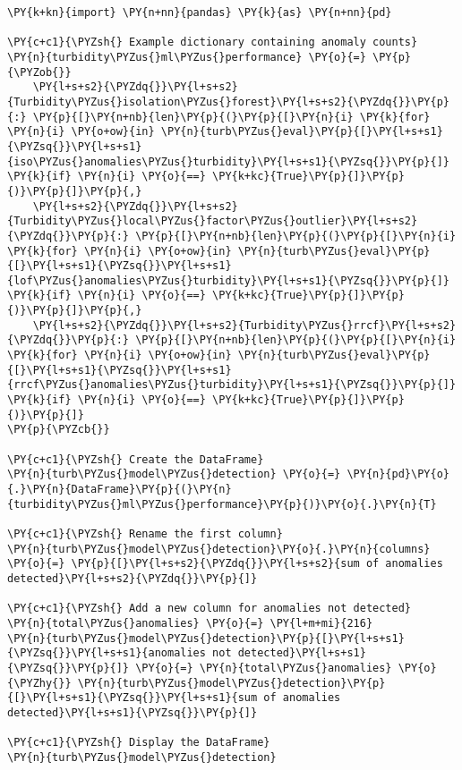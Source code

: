     \begin{tcolorbox}[breakable, size=fbox, boxrule=1pt, pad at break*=1mm,colback=cellbackground, colframe=cellborder]
\begin{Verbatim}[commandchars=\\\{\}]
\PY{k+kn}{import} \PY{n+nn}{pandas} \PY{k}{as} \PY{n+nn}{pd}

\PY{c+c1}{\PYZsh{} Example dictionary containing anomaly counts}
\PY{n}{turbidity\PYZus{}ml\PYZus{}performance} \PY{o}{=} \PY{p}{\PYZob{}}
    \PY{l+s+s2}{\PYZdq{}}\PY{l+s+s2}{Turbidity\PYZus{}isolation\PYZus{}forest}\PY{l+s+s2}{\PYZdq{}}\PY{p}{:} \PY{p}{[}\PY{n+nb}{len}\PY{p}{(}\PY{p}{[}\PY{n}{i} \PY{k}{for} \PY{n}{i} \PY{o+ow}{in} \PY{n}{turb\PYZus{}eval}\PY{p}{[}\PY{l+s+s1}{\PYZsq{}}\PY{l+s+s1}{iso\PYZus{}anomalies\PYZus{}turbidity}\PY{l+s+s1}{\PYZsq{}}\PY{p}{]} \PY{k}{if} \PY{n}{i} \PY{o}{==} \PY{k+kc}{True}\PY{p}{]}\PY{p}{)}\PY{p}{]}\PY{p}{,}
    \PY{l+s+s2}{\PYZdq{}}\PY{l+s+s2}{Turbidity\PYZus{}local\PYZus{}factor\PYZus{}outlier}\PY{l+s+s2}{\PYZdq{}}\PY{p}{:} \PY{p}{[}\PY{n+nb}{len}\PY{p}{(}\PY{p}{[}\PY{n}{i} \PY{k}{for} \PY{n}{i} \PY{o+ow}{in} \PY{n}{turb\PYZus{}eval}\PY{p}{[}\PY{l+s+s1}{\PYZsq{}}\PY{l+s+s1}{lof\PYZus{}anomalies\PYZus{}turbidity}\PY{l+s+s1}{\PYZsq{}}\PY{p}{]} \PY{k}{if} \PY{n}{i} \PY{o}{==} \PY{k+kc}{True}\PY{p}{]}\PY{p}{)}\PY{p}{]}\PY{p}{,}
    \PY{l+s+s2}{\PYZdq{}}\PY{l+s+s2}{Turbidity\PYZus{}rrcf}\PY{l+s+s2}{\PYZdq{}}\PY{p}{:} \PY{p}{[}\PY{n+nb}{len}\PY{p}{(}\PY{p}{[}\PY{n}{i} \PY{k}{for} \PY{n}{i} \PY{o+ow}{in} \PY{n}{turb\PYZus{}eval}\PY{p}{[}\PY{l+s+s1}{\PYZsq{}}\PY{l+s+s1}{rrcf\PYZus{}anomalies\PYZus{}turbidity}\PY{l+s+s1}{\PYZsq{}}\PY{p}{]} \PY{k}{if} \PY{n}{i} \PY{o}{==} \PY{k+kc}{True}\PY{p}{]}\PY{p}{)}\PY{p}{]}
\PY{p}{\PYZcb{}}

\PY{c+c1}{\PYZsh{} Create the DataFrame}
\PY{n}{turb\PYZus{}model\PYZus{}detection} \PY{o}{=} \PY{n}{pd}\PY{o}{.}\PY{n}{DataFrame}\PY{p}{(}\PY{n}{turbidity\PYZus{}ml\PYZus{}performance}\PY{p}{)}\PY{o}{.}\PY{n}{T}

\PY{c+c1}{\PYZsh{} Rename the first column}
\PY{n}{turb\PYZus{}model\PYZus{}detection}\PY{o}{.}\PY{n}{columns} \PY{o}{=} \PY{p}{[}\PY{l+s+s2}{\PYZdq{}}\PY{l+s+s2}{sum of anomalies detected}\PY{l+s+s2}{\PYZdq{}}\PY{p}{]}

\PY{c+c1}{\PYZsh{} Add a new column for anomalies not detected}
\PY{n}{total\PYZus{}anomalies} \PY{o}{=} \PY{l+m+mi}{216}
\PY{n}{turb\PYZus{}model\PYZus{}detection}\PY{p}{[}\PY{l+s+s1}{\PYZsq{}}\PY{l+s+s1}{anomalies not detected}\PY{l+s+s1}{\PYZsq{}}\PY{p}{]} \PY{o}{=} \PY{n}{total\PYZus{}anomalies} \PY{o}{\PYZhy{}} \PY{n}{turb\PYZus{}model\PYZus{}detection}\PY{p}{[}\PY{l+s+s1}{\PYZsq{}}\PY{l+s+s1}{sum of anomalies detected}\PY{l+s+s1}{\PYZsq{}}\PY{p}{]}

\PY{c+c1}{\PYZsh{} Display the DataFrame}
\PY{n}{turb\PYZus{}model\PYZus{}detection}
\end{Verbatim}
\end{tcolorbox}

